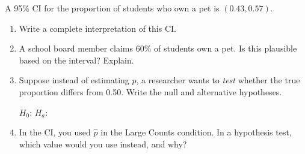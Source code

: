 \documentclass[10pt]{article}
\begin{document}
\namedateperiod

\vspace{0.15in}

A 95\% CI for the proportion of students who own a pet is $(0.43, 0.57)$.

\begin{enumerate}
  \item Write a complete interpretation of this CI.

  \item A school board member claims 60\% of students own a pet. Is this plausible
        based on the interval? Explain.

  \item Suppose instead of estimating $p$, a researcher wants to \emph{test} whether the
        true proportion differs from 0.50. Write the null and alternative hypotheses.

        $H_0$: \blank{5cm}  \quad $H_a$: \blank{5cm}

  \item In the CI, you used $\hat p$ in the Large Counts condition. In a hypothesis test,
        which value would you use instead, and why?
\end{enumerate}
\end{document}
